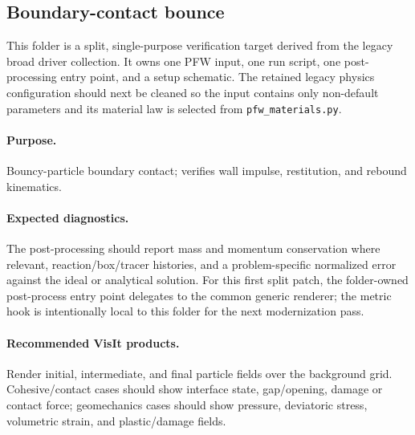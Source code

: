 \subsection{Boundary-contact bounce}
\label{sec:boundaryContactBounce}

This folder is a split, single-purpose verification target derived from the
legacy broad driver collection.  It owns one PFW input, one run script, one
post-processing entry point, and a setup schematic.  The retained legacy physics
configuration should next be cleaned so the input contains only non-default
parameters and its material law is selected from \texttt{pfw\_materials.py}.

\paragraph{Purpose.} Bouncy-particle boundary contact; verifies wall impulse, restitution, and rebound kinematics.

\paragraph{Expected diagnostics.} The post-processing should report mass and
momentum conservation where relevant, reaction/box/tracer histories, and a
problem-specific normalized error against the ideal or analytical solution.  For
this first split patch, the folder-owned post-process entry point delegates to
the common generic renderer; the metric hook is intentionally local to this
folder for the next modernization pass.

\paragraph{Recommended VisIt products.} Render initial, intermediate, and final
particle fields over the background grid.  Cohesive/contact cases should show
interface state, gap/opening, damage or contact force; geomechanics cases should
show pressure, deviatoric stress, volumetric strain, and plastic/damage fields.
